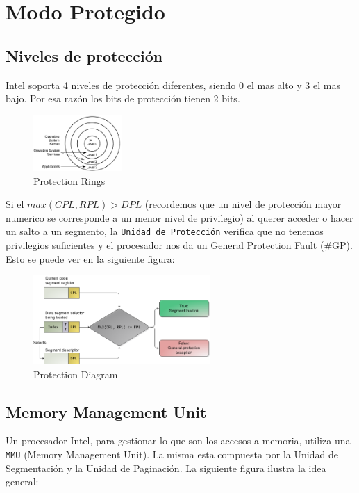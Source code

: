 \section{Modo Protegido}

\subsection{Niveles de protección}

Intel soporta 4 niveles de protección diferentes, siendo 0 el mas alto y 3 el mas bajo. Por esa razón los bits de protección tienen 2 bits.

\begin{figure}[h!]
  \centering
    \includegraphics[width=0.3\textwidth]{images/protection_rings}
  \caption{Protection Rings}
\end{figure}

Si el $max(CPL, RPL) > DPL$ (recordemos que un nivel de protección mayor numerico se corresponde a un menor nivel de privilegio) al querer acceder o hacer un salto a un segmento, la \texttt{Unidad de Protección} verifica que no tenemos privilegios suficientes y el procesador nos da un General Protection Fault (\#GP). Esto se puede ver en la siguiente figura:

\begin{figure}[H]
  \centering
    \includegraphics[width=0.6\textwidth]{images/protection}
  \caption{Protection Diagram}
\end{figure}

\subsection{Memory Management Unit}
Un procesador Intel, para gestionar lo que son los accesos a memoria, utiliza una \texttt{MMU} (Memory Management Unit). La misma esta compuesta por la Unidad de Segmentación y la Unidad de Paginación. La siguiente figura ilustra la idea general:

